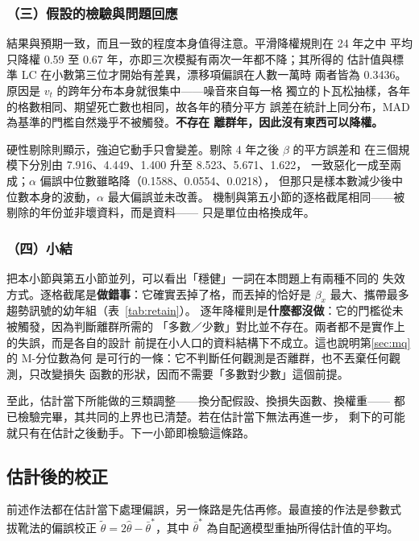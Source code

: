 \documentclass[UTF8, fontset=macnew, a4paper, 12pt]{ctexart}
\begin{document}
\subsubsection{（三）假設的檢驗與問題回應}

結果與預期一致，而且一致的程度本身值得注意。平滑降權規則在 24 年之中
平均只降權 0.59 至 0.67 年，亦即三次模擬有兩次一年都不降；其所得的
估計值與標準 LC 在小數第三位才開始有差異，漂移項偏誤在人數一萬時
兩者皆為 0.3436。原因是 $v_t$ 的跨年分布本身就很集中——噪音來自每一格
獨立的卜瓦松抽樣，各年的格數相同、期望死亡數也相同，故各年的積分平方
誤差在統計上同分布，MAD 為基準的門檻自然幾乎不被觸發。\textbf{不存在
離群年，因此沒有東西可以降權。}

硬性剔除則顯示，強迫它動手只會變差。剔除 4 年之後 $\beta$ 的平方誤差和
在三個規模下分別由 7.916、4.449、1.400 升至 8.523、5.671、1.622，
一致惡化一成至兩成；$\alpha$ 偏誤中位數雖略降（0.1588、0.0554、0.0218），
但那只是樣本數減少後中位數本身的波動，$\alpha$ 最大偏誤並未改善。
機制與第五小節的逐格截尾相同——被剔除的年份並非壞資料，而是資料——
只是單位由格換成年。

\subsubsection{（四）小結}

把本小節與第五小節並列，可以看出「穩健」一詞在本問題上有兩種不同的
失效方式。逐格截尾是\textbf{做錯事}：它確實丟掉了格，而丟掉的恰好是
$\beta_x$ 最大、攜帶最多趨勢訊號的幼年組（表~\ref{tab:retain}）。
逐年降權則是\textbf{什麼都沒做}：它的門檻從未被觸發，因為判斷離群所需的
「多數／少數」對比並不存在。兩者都不是實作上的失誤，而是各自的設計
前提在小人口的資料結構下不成立。這也說明第\ref{sec:mq}的 M-分位數為何
是可行的一條：它不判斷任何觀測是否離群，也不丟棄任何觀測，只改變損失
函數的形狀，因而不需要「多數對少數」這個前提。

至此，估計當下所能做的三類調整——換分配假設、換損失函數、換權重——
都已檢驗完畢，其共同的上界也已清楚。若在估計當下無法再進一步，
剩下的可能就只有在估計之後動手。下一小節即檢驗這條路。

\subsection{估計後的校正}\label{sec:postcorr}

前述作法都在估計當下處理偏誤，另一條路是先估再修。最直接的作法是參數式
拔靴法的偏誤校正 $\tilde\theta=2\hat\theta-\bar\theta^*$，其中
$\bar\theta^*$ 為自配適模型重抽所得估計值的平均。
\end{document}
